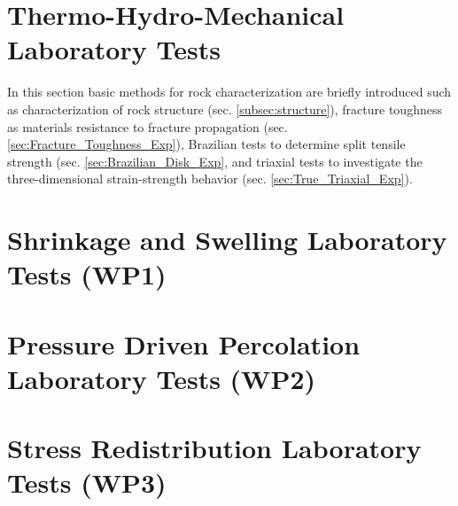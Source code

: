 \section{Thermo-Hydro-Mechanical Laboratory Tests}
\label{sec:thm-lab-tests}
In this section basic methods for rock characterization are briefly introduced such as 
characterization of rock structure (sec. \ref{subsec:structure}),
fracture toughness as materials resistance to fracture propagation (sec. \ref{sec:Fracture_Toughness_Exp}),
Brazilian tests to determine split tensile strength (sec. \ref{sec:Brazilian_Disk_Exp},
and triaxial tests to investigate the three-dimensional strain-strength behavior (sec. \ref{sec:True_Triaxial_Exp}).




\clearpage

\clearpage
\section{Shrinkage and Swelling Laboratory Tests (WP1)}
\label{sec:lab-wp1}

\clearpage
\section{Pressure Driven Percolation Laboratory Tests (WP2)}
\label{sec:lab-wp2}

\clearpage
\section{Stress Redistribution Laboratory Tests (WP3)}
\label{sec:lab-wp3}

